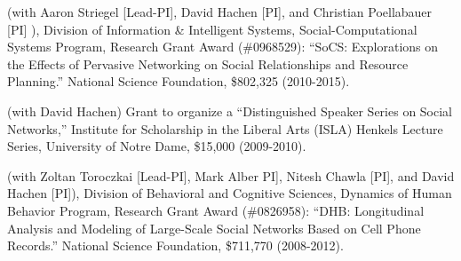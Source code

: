  (with Aaron Striegel [Lead-PI], David Hachen [PI], and Christian Poellabauer [PI] ), Division of Information \& Intelligent Systems, Social-Computational Systems Program, Research Grant Award (\#0968529): ``SoCS:  Explorations on the Effects of Pervasive Networking on Social Relationships and Resource Planning.'' National Science Foundation, \$802,325 (2010-2015).

 (with David Hachen) Grant to organize a ``Distinguished Speaker Series on Social Networks,'' Institute for Scholarship in the Liberal Arts (ISLA) Henkels Lecture Series, University of Notre Dame, \$15,000 (2009-2010).

 (with Zoltan Toroczkai [Lead-PI], Mark Alber PI], Nitesh Chawla [PI], and David Hachen [PI]), Division of Behavioral and Cognitive Sciences, Dynamics of Human Behavior Program, Research Grant Award (\#0826958): ``DHB: Longitudinal Analysis and Modeling of Large-Scale Social Networks Based on Cell Phone Records.''  National Science Foundation, \$711,770 (2008-2012).

